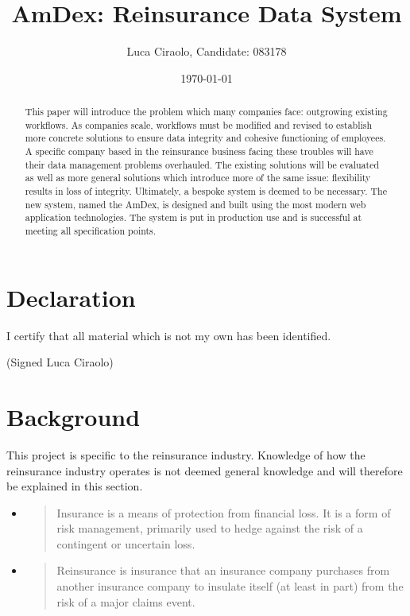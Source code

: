 \documentclass[12pt]{article}
\title{AmDex: Reinsurance Data System}
\author{Luca Ciraolo, Candidate: 083178}
\date{\today}
\begin{document}
\maketitle
\begin{abstract}
    This paper will introduce the problem which many companies face: outgrowing existing workflows. As companies scale, workflows must be modified and revised to establish more concrete solutions to ensure data integrity and cohesive functioning of employees. A specific company based in the reinsurance business facing these troubles will have their data management problems overhauled. The existing solutions will be evaluated as well as more general solutions which introduce more of the same issue: flexibility results in loss of integrity. Ultimately, a bespoke system is deemed to be necessary. The new system, named the AmDex, is designed and built using the most modern web application technologies. The system is put in production use and is successful at meeting all specification points.
\end{abstract}

\section*{Declaration}
I certify that all material which is not my own has been identified.

(Signed Luca Ciraolo)
\newpage

\tableofcontents
\newpage

\section{Background}
This project is specific to the reinsurance industry. Knowledge of how the reinsurance industry operates is not deemed general knowledge and will therefore be explained in this section.

\begin{itemize}
    \item \blockquote[\cite{wikipedia_insurance}]{Insurance is a means of protection from financial loss. It is a form of risk management, primarily used to hedge against the risk of a contingent or uncertain loss.}
    \item \blockquote[\cite{wikipedia_reinsurance}]{Reinsurance is insurance that an insurance company purchases from another insurance company to insulate itself (at least in part) from the risk of a major claims event.}
\end{itemize}
\end{document}
